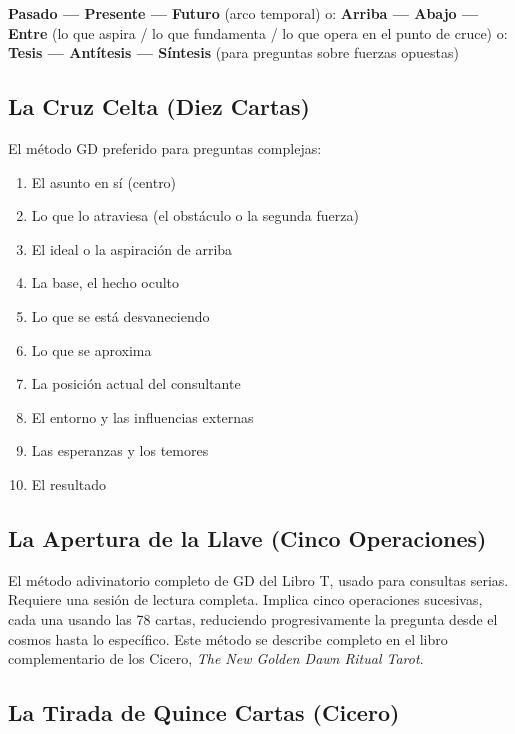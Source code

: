 \textbf{Pasado --- Presente --- Futuro} (arco temporal) o: \textbf{Arriba --- Abajo --- Entre} (lo que aspira / lo que fundamenta / lo que opera en el punto de cruce) o: \textbf{Tesis --- Antítesis --- Síntesis} (para preguntas sobre fuerzas opuestas)

\subsection{La Cruz Celta (Diez Cartas)}\label{the-celtic-cross-ten-cards}

El método GD preferido para preguntas complejas:

\begin{enumerate}
\def\labelenumi{\arabic{enumi}.}
\tightlist
\item
  El asunto en sí (centro)
\item
  Lo que lo atraviesa (el obstáculo o la segunda fuerza)
\item
  El ideal o la aspiración de arriba
\item
  La base, el hecho oculto
\item
  Lo que se está desvaneciendo
\item
  Lo que se aproxima
\item
  La posición actual del consultante
\item
  El entorno y las influencias externas
\item
  Las esperanzas y los temores
\item
  El resultado
\end{enumerate}

\subsection{La Apertura de la Llave (Cinco Operaciones)}\label{the-opening-of-the-key-five-operations}

El método adivinatorio completo de GD del Libro T, usado para consultas serias. Requiere una sesión de lectura completa. Implica cinco operaciones sucesivas, cada una usando las 78 cartas, reduciendo progresivamente la pregunta desde el cosmos hasta lo específico. Este método se describe completo en el libro complementario de los Cicero, \emph{The New Golden Dawn Ritual Tarot}.

\subsection{La Tirada de Quince Cartas (Cicero)}\label{the-fifteen-card-spread}

